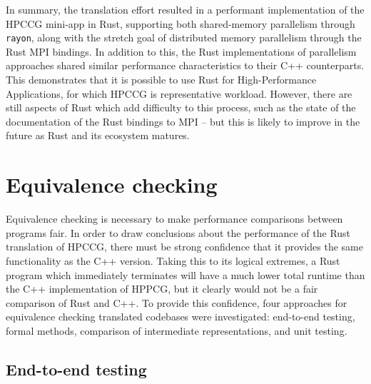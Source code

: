
In summary, the translation effort resulted in a performant implementation of the HPCCG mini-app in Rust, supporting both shared-memory parallelism through \texttt{rayon}, along with the stretch goal of distributed memory parallelism through the Rust MPI bindings. In addition to this, the Rust implementations of parallelism approaches shared similar performance characteristics to their C++ counterparts. This demonstrates that it is possible to use Rust for High-Performance Applications, for which HPCCG is representative workload. However, there are still aspects of Rust which add difficulty to this process, such as the state of the documentation of the Rust bindings to MPI -- but this is likely to improve in the future as Rust and its ecosystem matures.


\section{Equivalence checking}
\label{sec:equivalence-checking}

Equivalence checking is necessary to make performance comparisons between programs fair. In order to draw conclusions about the performance of the Rust translation of HPCCG, there must be strong confidence that it provides the same functionality as the C++ version. Taking this to its logical extremes, a Rust program which immediately terminates will have a much lower total runtime than the C++ implementation of HPPCG, but it clearly would not be a fair comparison of Rust and C++.
To provide this confidence, four approaches for equivalence checking translated codebases were investigated: end-to-end testing, formal methods, comparison of intermediate representations, and unit testing.

\subsection{End-to-end testing}
\label{ssec:equivalence-end-to-end}

